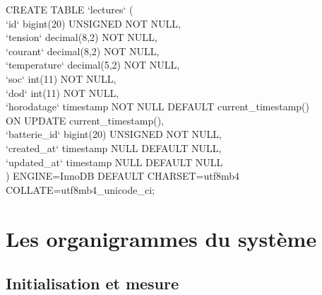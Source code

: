 \noindent CREATE TABLE `lectures` (\\
`id` bigint(20) UNSIGNED NOT NULL,\\
`tension` decimal(8,2) NOT NULL,\\
`courant` decimal(8,2) NOT NULL,\\
`temperature` decimal(5,2) NOT NULL,\\
`soc` int(11) NOT NULL,\\
`dod` int(11) NOT NULL,\\
`horodatage` timestamp NOT NULL DEFAULT current\_timestamp()\\
 ON UPDATE current\_timestamp(),\\
`batterie\_id` bigint(20) UNSIGNED NOT NULL,\\
`created\_at` timestamp NULL DEFAULT NULL,\\
`updated\_at` timestamp NULL DEFAULT NULL\\
) ENGINE=InnoDB DEFAULT CHARSET=utf8mb4 COLLATE=utf8mb4\_unicode\_ci;\\


\section{Les organigrammes du système}
\subsection{Initialisation et mesure}




